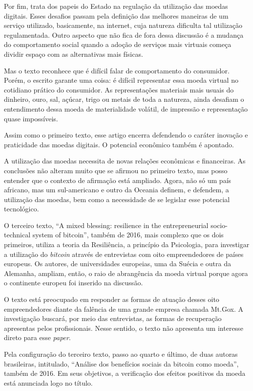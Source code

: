 \documentclass[12pt]{article}
\begin{document}
Por fim, trata dos papeis do Estado na regulação da utilização das moedas digitais. Esses desafios passam pela definição das melhores maneiras de um serviço utilizado, basicamente, na internet, cuja natureza dificulta tal utilização regulamentada. Outro aspecto que não fica de fora dessa discussão é a mudança do comportamento social quando a adoção de serviços mais virtuais começa dividir espaço com as alternativas mais físicas.

Mas o texto reconhece que é difícil falar de comportamento do consumidor. Porém, o escrito garante uma coisa: é difícil representar essa moeda virtual no cotidiano prático do consumidor. As representações materiais mais usuais do dinheiro, ouro, sal, açúcar, trigo ou metais de toda a natureza, ainda desafiam o entendimento dessa moeda de materialidade volátil, de impressão e representação quase impossíveis.

Assim como o primeiro texto, esse artigo encerra defendendo o caráter inovação e praticidade das moedas digitais. O potencial econômico também é apontado.

A utilização das moedas necessita de novas relações econômicas e financeiras. As conclusões não alteram muito que se afirmou no primeiro texto, mas posso entender que o contexto de afirmação está ampliado. Agora, não só um país africano, mas um sul-americano e outro da Oceania definem, e defendem, a utilização das moedas, bem como a necessidade de se legislar esse potencial tecnológico.

O terceiro texto, “A mixed blessing: resilience in the entrepreneurial socio-technical system of bitcoin”, também de 2016, mais complexo que os dois primeiros, utiliza a teoria da Resiliência, a princípio da Psicologia, para investigar a utilização do \textit{bitcoin} através de entrevistas com oito empreendedores de países europeus. Os autores, de universidades europeias, uma da Suécia e outra da Alemanha, ampliam, então, o raio de abrangência da moeda virtual porque agora o continente europeu foi inserido na discussão.

O texto está preocupado em responder as formas de atuação desses oito empreendedores diante da falência de uma grande empresa chamada Mt.Gox. A investigação buscará, por meio das entrevistas, as formas de recuperação apresentas pelos profissionais. Nesse sentido, o texto não apresenta um interesse direto para esse \textit{paper}.

Pela configuração do terceiro texto, passo ao quarto e último, de duas autoras brasileiras, intitulado, “Análise dos benefícios sociais da bitcoin como moeda”, também de 2016. Em seus objetivos, a verificação dos efeitos positivos da moeda está anunciada logo no título.
\end{document}
